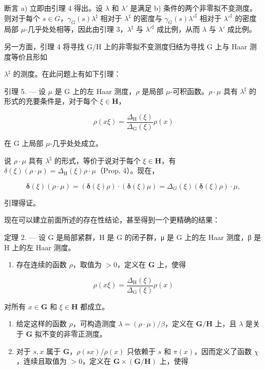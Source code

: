 断言 a) 立即由引理 4 得出。设 \(\lambda\) 和 \(\lambda'\) 是满足 b) 条件的两个非零拟不变测度。则对于每个 \(s \in G\)，\(\gamma_G(s)\lambda^\sharp\) 相对于 \(\lambda^\sharp\) 的密度与 \(\gamma_G(s)\lambda'^\sharp\) 相对于 \(\lambda'^\sharp\) 的密度局部 \(\mu\)-几乎处处相等，因此由引理 3，\(\lambda^\sharp\) 与 \(\lambda'^\sharp\) 成比例，从而 \(\lambda\) 与 \(\lambda'\) 成比例。

另一方面，引理 4 将寻找 G/H 上的非零拟不变测度归结为寻找 G 上与 Haar 测度等价且形如

\(\lambda^{\sharp}\) 的测度。在此问题上有如下引理：

引理 5. --- 设 \(\mu\) 是 G 上的左 Haar 测度，\(\rho\) 是局部 \(\mu\)-可积函数。\(\rho \cdot \mu\) 具有 \(\lambda^{\sharp}\) 的形式的充要条件是，对于每个 \(\xi \in \mathbf{H}\)，

\[
\rho (x \xi) = \frac {\Delta_ {\mathrm{H}} (\xi)}{\Delta_ {\mathrm{G}} (\xi)} \rho (x)\tag{18}
\]

在 G 上局部 \(\mu\)-几乎处处成立。

说 \(\rho \cdot \mu\) 具有 \(\lambda^{\sharp}\) 的形式，等价于说对于每个 \(\xi \in \mathbf{H}\)，有 \(\delta(\xi)(\rho \cdot \mu) = \Delta_{\mathrm{H}}(\xi)\rho \cdot \mu\)（Prop. 4）。现在，

\[
\boldsymbol {\delta} (\xi) (\rho \cdot \mu) = (\boldsymbol {\delta} (\xi) \rho) \cdot (\boldsymbol {\delta} (\xi) \mu) = \Delta_ {G} (\xi) (\boldsymbol {\delta} (\xi) \rho) \cdot \mu ,
\]

引理得证。

现在可以建立前面所述的存在性结论，甚至得到一个更精确的结果：

定理 2. --- 设 G 是局部紧群，H 是 G 的闭子群，μ 是 G 上的左 Haar 测度，β 是 H 上的左 Haar 测度。

\begin{enumerate}
\def\labelenumi{\alph{enumi})}
\tightlist
\item
  存在连续的函数 \(\rho\)，取值为 \(>0\)，定义在 \(\mathbf{G}\) 上，使得
\end{enumerate}

\[
\rho (x \xi) = \frac {\Delta_ {\mathrm{H}} (\xi)}{\Delta_ {\mathrm{G}} (\xi)} \rho (x)
\]

对所有 \(x \in \mathbf{G}\) 和 \(\xi \in \mathbf{H}\) 都成立。

\begin{enumerate}
\def\labelenumi{\alph{enumi})}
\setcounter{enumi}{1}
\item
  给定这样的函数 \(\rho\)，可构造测度 \(\lambda = (\rho \cdot \mu) / \beta\)，定义在 \(\mathbf{G} / \mathbf{H}\) 上，且 \(\lambda\) 是关于 \(\mathbf{G}\) 拟不变的非零正测度。
\item
  对于 \(s, x\) 属于 \(\mathbf{G}\)，\(\rho(sx) / \rho(x)\) 只依赖于 \(s\) 和 \(\pi(x)\)，因而定义了函数 \(\chi\)，连续且取值为 \(>0\)，定义在 \(\mathbf{G} \times (\mathbf{G} / \mathbf{H})\) 上，使得
\end{enumerate}

